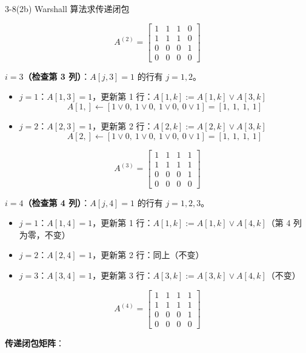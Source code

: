 \documentclass[11pt]{article}
\begin{document}
\begin{question}{3-8(2b) Warshall 算法求传递闭包}
\begin{answer}
    $$A^{(2)} = \begin{bmatrix} 1 & 1 & 1 & 0 \\ 1 & 1 & 1 & 0 \\ 0 & 0 & 0 & 1 \\ 0 & 0 & 0 & 0 \end{bmatrix}$$

    \vspace{0.5em}
    \textbf{$i = 3$（检查第 3 列）}：$A[j,3] = 1$ 的行有 $j=1, 2$。

    \begin{itemize}
      \item $j=1$：$A[1,3]=1$，更新第 1 行：$A[1,k] := A[1,k] \lor A[3,k]$
        $$A[1,] \leftarrow [1\lor 0,\ 1\lor 0,\ 1\lor 0,\ 0\lor 1] = [1,\ 1,\ 1,\ 1]$$
      \item $j=2$：$A[2,3]=1$，更新第 2 行：$A[2,k] := A[2,k] \lor A[3,k]$
        $$A[2,] \leftarrow [1\lor 0,\ 1\lor 0,\ 1\lor 0,\ 0\lor 1] = [1,\ 1,\ 1,\ 1]$$
    \end{itemize}

    $$A^{(3)} = \begin{bmatrix} 1 & 1 & 1 & 1 \\ 1 & 1 & 1 & 1 \\ 0 & 0 & 0 & 1 \\ 0 & 0 & 0 & 0 \end{bmatrix}$$

    \vspace{0.5em}
    \textbf{$i = 4$（检查第 4 列）}：$A[j,4] = 1$ 的行有 $j=1, 2, 3$。

    \begin{itemize}
      \item $j=1$：$A[1,4]=1$，更新第 1 行：$A[1,k] := A[1,k] \lor A[4,k]$（第 4 列为零，不变）
      \item $j=2$：$A[2,4]=1$，更新第 2 行：同上（不变）
      \item $j=3$：$A[3,4]=1$，更新第 3 行：$A[3,k] := A[3,k] \lor A[4,k]$（不变）
    \end{itemize}

    $$A^{(4)} = \begin{bmatrix} 1 & 1 & 1 & 1 \\ 1 & 1 & 1 & 1 \\ 0 & 0 & 0 & 1 \\ 0 & 0 & 0 & 0 \end{bmatrix}$$

    \vspace{0.5em}
    \textbf{传递闭包矩阵}：


\end{answer}
\end{question}
\end{document}
